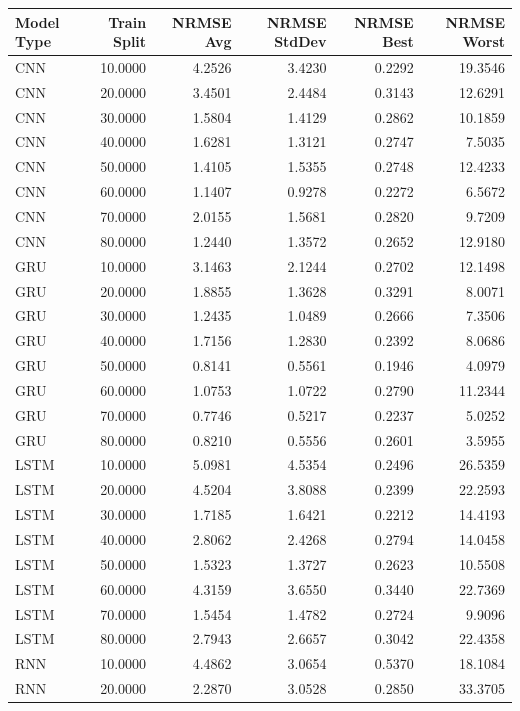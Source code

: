 \begin{tabular}{lrrrrr}
\toprule
Model Type & Train Split & NRMSE Avg & NRMSE StdDev & NRMSE Best & NRMSE Worst \\
\midrule
CNN & 10.0000 & 4.2526 & 3.4230 & 0.2292 & 19.3546 \\
CNN & 20.0000 & 3.4501 & 2.4484 & 0.3143 & 12.6291 \\
CNN & 30.0000 & 1.5804 & 1.4129 & 0.2862 & 10.1859 \\
CNN & 40.0000 & 1.6281 & 1.3121 & 0.2747 & 7.5035 \\
CNN & 50.0000 & 1.4105 & 1.5355 & 0.2748 & 12.4233 \\
CNN & 60.0000 & 1.1407 & 0.9278 & 0.2272 & 6.5672 \\
CNN & 70.0000 & 2.0155 & 1.5681 & 0.2820 & 9.7209 \\
CNN & 80.0000 & 1.2440 & 1.3572 & 0.2652 & 12.9180 \\
GRU & 10.0000 & 3.1463 & 2.1244 & 0.2702 & 12.1498 \\
GRU & 20.0000 & 1.8855 & 1.3628 & 0.3291 & 8.0071 \\
GRU & 30.0000 & 1.2435 & 1.0489 & 0.2666 & 7.3506 \\
GRU & 40.0000 & 1.7156 & 1.2830 & 0.2392 & 8.0686 \\
GRU & 50.0000 & 0.8141 & 0.5561 & 0.1946 & 4.0979 \\
GRU & 60.0000 & 1.0753 & 1.0722 & 0.2790 & 11.2344 \\
GRU & 70.0000 & 0.7746 & 0.5217 & 0.2237 & 5.0252 \\
GRU & 80.0000 & 0.8210 & 0.5556 & 0.2601 & 3.5955 \\
LSTM & 10.0000 & 5.0981 & 4.5354 & 0.2496 & 26.5359 \\
LSTM & 20.0000 & 4.5204 & 3.8088 & 0.2399 & 22.2593 \\
LSTM & 30.0000 & 1.7185 & 1.6421 & 0.2212 & 14.4193 \\
LSTM & 40.0000 & 2.8062 & 2.4268 & 0.2794 & 14.0458 \\
LSTM & 50.0000 & 1.5323 & 1.3727 & 0.2623 & 10.5508 \\
LSTM & 60.0000 & 4.3159 & 3.6550 & 0.3440 & 22.7369 \\
LSTM & 70.0000 & 1.5454 & 1.4782 & 0.2724 & 9.9096 \\
LSTM & 80.0000 & 2.7943 & 2.6657 & 0.3042 & 22.4358 \\
RNN & 10.0000 & 4.4862 & 3.0654 & 0.5370 & 18.1084 \\
RNN & 20.0000 & 2.2870 & 3.0528 & 0.2850 & 33.3705 \\

\end{tabular}

